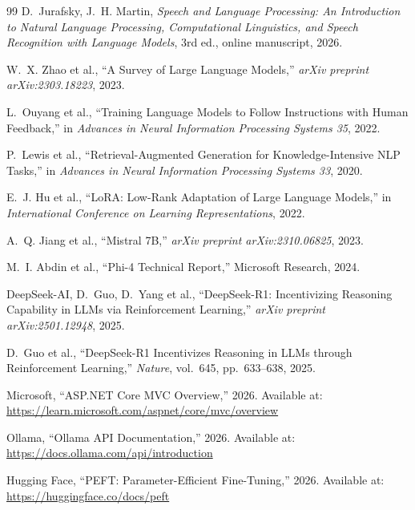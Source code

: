 \documentclass[12pt]{article}
\newcommand{\listequations}{\listofequationlist}
\begin{document}
\begin{thebibliography}{99}
D.~Jurafsky, J.~H. Martin,
\textit{Speech and Language Processing: An Introduction to Natural Language Processing,
Computational Linguistics, and Speech Recognition with Language Models},
3rd ed., online manuscript, 2026.

W.~X. Zhao et al.,
``A Survey of Large Language Models,''
\textit{arXiv preprint arXiv:2303.18223}, 2023.

L.~Ouyang et al.,
``Training Language Models to Follow Instructions with Human Feedback,''
in \textit{Advances in Neural Information Processing Systems 35},
2022.

P.~Lewis et al.,
``Retrieval-Augmented Generation for Knowledge-Intensive NLP Tasks,''
in \textit{Advances in Neural Information Processing Systems 33},
2020.

E.~J. Hu et al.,
``LoRA: Low-Rank Adaptation of Large Language Models,''
in \textit{International Conference on Learning Representations},
2022.

A.~Q. Jiang et al.,
``Mistral 7B,''
\textit{arXiv preprint arXiv:2310.06825}, 2023.

M.~I. Abdin et al.,
``Phi-4 Technical Report,''
Microsoft Research, 2024.

DeepSeek-AI, D.~Guo, D.~Yang et al.,
``DeepSeek-R1: Incentivizing Reasoning Capability in LLMs via Reinforcement Learning,''
\textit{arXiv preprint arXiv:2501.12948}, 2025.

D.~Guo et al.,
``DeepSeek-R1 Incentivizes Reasoning in LLMs through Reinforcement Learning,''
\textit{Nature}, vol.~645, pp.~633--638, 2025.

Microsoft,
``ASP.NET Core MVC Overview,''
2026.
Available at: \url{https://learn.microsoft.com/aspnet/core/mvc/overview}

Ollama,
``Ollama API Documentation,''
2026.
Available at: \url{https://docs.ollama.com/api/introduction}

Hugging Face,
``PEFT: Parameter-Efficient Fine-Tuning,''
2026.
Available at: \url{https://huggingface.co/docs/peft}

\end{thebibliography}


\clearpage
\lstlistoflistings
\clearpage
\listoftables

\clearpage
\listequations
\end{document}
